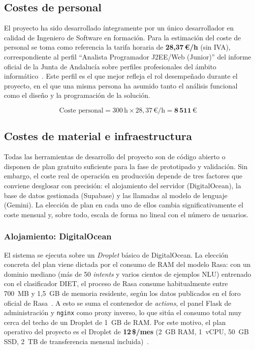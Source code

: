 \subsection{Costes de personal}

El proyecto ha sido desarrollado íntegramente por un único desarrollador en calidad de Ingeniero de Software en formación. Para la estimación del coste de personal se toma como referencia la tarifa horaria de \textbf{28,37\,€/h} (sin IVA), correspondiente al perfil ``Analista Programador J2EE/Web (Junior)'' del informe oficial de la Junta de Andalucía sobre perfiles profesionales del ámbito informático~\cite{jdaPreciosTIC2018}. Este perfil es el que mejor refleja el rol desempeñado durante el proyecto, en el que una misma persona ha asumido tanto el análisis funcional como el diseño y la programación de la solución.

\[
\text{Coste personal} = 300\,\text{h} \times 28{,}37\,\text{€/h} = \mathbf{8\,511\,\text{€}}
\]

\subsection{Costes de material e infraestructura}

Todas las herramientas de desarrollo del proyecto son de código abierto o disponen de plan gratuito suficiente para la fase de prototipado y validación. Sin embargo, el coste real de operación en producción depende de tres factores que conviene desglosar con precisión: el alojamiento del servidor (DigitalOcean), la base de datos gestionada (Supabase) y las llamadas al modelo de lenguaje (Gemini). La elección de plan en cada uno de ellos cambia significativamente el coste mensual y, sobre todo, escala de forma no lineal con el número de usuarios.

\subsubsection{Alojamiento: DigitalOcean}

El sistema se ejecuta sobre un \textit{Droplet} básico de DigitalOcean. La elección concreta del plan viene dictada por el consumo de RAM del modelo Rasa: con un dominio mediano (más de 50 \textit{intents} y varios cientos de ejemplos NLU) entrenado con el clasificador DIET, el proceso de Rasa consume habitualmente entre 700~MB y 1,5~GB de memoria residente, según los datos publicados en el foro oficial de Rasa~\cite{rasaForumMemory}. A esto se suma el contenedor de \textit{actions}, el panel Flask de administración y \texttt{nginx} como proxy inverso, lo que sitúa el consumo total muy cerca del techo de un Droplet de 1~GB de RAM. Por este motivo, el plan operativo del proyecto es el Droplet de \textbf{12\,\$/mes} (2~GB RAM, 1~vCPU, 50~GB SSD, 2~TB de transferencia mensual incluida)~\cite{doDroplets}.

